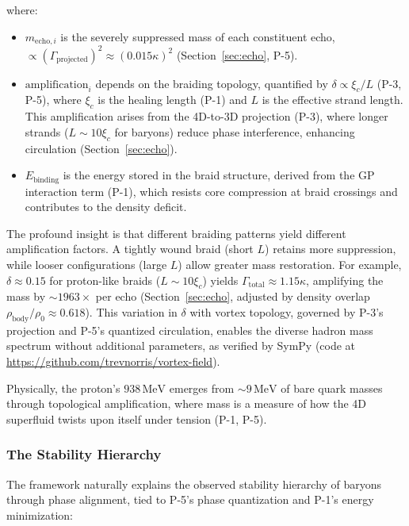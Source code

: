 where:
\begin{itemize}
\item $m_{\text{echo},i}$ is the severely suppressed mass of each constituent echo, $\propto (\Gamma_{\text{projected}})^2 \approx (0.015 \kappa)^2$ (Section~\ref{sec:echo}, P-5).
\item $\text{amplification}_i$ depends on the braiding topology, quantified by $\delta \propto \xi_c/L$ (P-3, P-5), where $\xi_c$ is the healing length (P-1) and $L$ is the effective strand length. This amplification arises from the 4D-to-3D projection (P-3), where longer strands ($L \sim 10 \xi_c$ for baryons) reduce phase interference, enhancing circulation (Section~\ref{sec:echo}).
\item $E_{\text{binding}}$ is the energy stored in the braid structure, derived from the GP interaction term (P-1), which resists core compression at braid crossings and contributes to the density deficit.
\end{itemize}

The profound insight is that different braiding patterns yield different amplification factors. A tightly wound braid (short $L$) retains more suppression, while looser configurations (large $L$) allow greater mass restoration. For example, $\delta \approx 0.15$ for proton-like braids ($L \sim 10 \xi_c$) yields $\Gamma_{\text{total}} \approx 1.15 \kappa$, amplifying the mass by $\sim 1963\times$ per echo (Section~\ref{sec:echo}, adjusted by density overlap $\rho_{\text{body}} / \rho_0 \approx 0.618$). This variation in $\delta$ with vortex topology, governed by P-3's projection and P-5's quantized circulation, enables the diverse hadron mass spectrum without additional parameters, as verified by SymPy (code at \url{https://github.com/trevnorris/vortex-field}).

Physically, the proton's $938 \, \text{MeV}$ emerges from $\sim 9 \, \text{MeV}$ of bare quark masses through topological amplification, where mass is a measure of how the 4D superfluid twists upon itself under tension (P-1, P-5).

\subsubsection{The Stability Hierarchy}

The framework naturally explains the observed stability hierarchy of baryons through phase alignment, tied to P-5's phase quantization and P-1's energy minimization:


